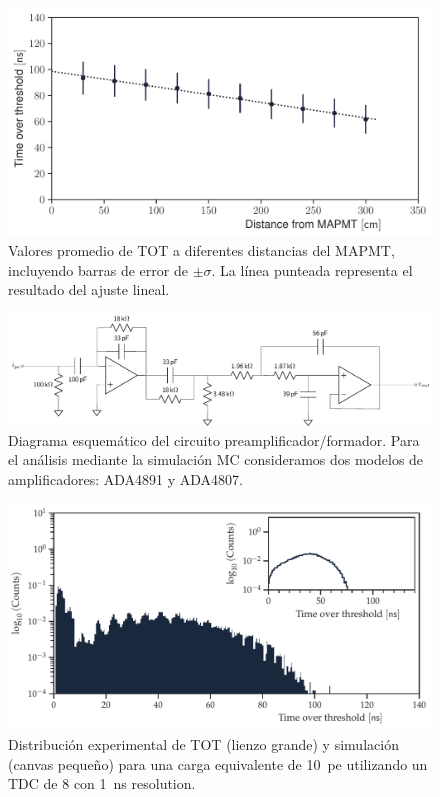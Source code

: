 \begin{figure}
        \centering
        \includegraphics[width=\textwidth]{tot_distance.pdf}
        \caption{Valores promedio de TOT a diferentes distancias del MAPMT, incluyendo barras de error de $\pm\sigma$. La línea punteada representa el resultado del ajuste lineal.}
        \label{fig:tot-distance}
\end{figure}

\begin{figure}
        \centering
        \includegraphics[width=\textwidth]{preamp-shaper-final.pdf}
        \caption{Diagrama esquemático del circuito preamplificador/formador. Para el análisis mediante la simulación MC consideramos dos modelos de amplificadores: ADA4891 y ADA4807.}
        \label{fig:preamp-shaper}
\end{figure}

\begin{figure}
        \centering
        \includegraphics[width=\textwidth]{tdc_sim-exp.pdf}
        \caption{Distribución experimental de TOT (lienzo grande) y simulación (canvas pequeño) para una carga equivalente de \SI{10}{pe} utilizando un TDC de \SI{8}{\bit} con \SI{1}{\ns} resolution.}
        \label{fig:tdc-simexp}
\end{figure}
